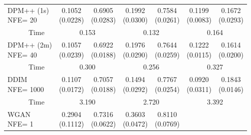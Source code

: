\documentclass[12pt]{article}
\theoremstyle{definition} %
\begin{document}
\begin{table}
\begin{tabular}{l*{3}{cc}}
 \cmidrule(lr){1-7}
 \makecell{DPM++ (1s)\\\scriptsize{NFE= 20}}
 & \makecell{0.1052\\\scriptsize(0.0228)} & \makecell{0.6905\\\scriptsize(0.0283)}
 & \makecell{0.1992\\\scriptsize(0.0300)} & \makecell{0.7584\\\scriptsize(0.0261)}
 & \makecell{0.1199\\\scriptsize(0.0083)} & \makecell{0.1672\\\scriptsize(0.0293)} \\
~~~~~~Time  & \multicolumn{2}{c}{0.153} & \multicolumn{2}{c}{0.132} & \multicolumn{2}{c}{0.164} \\
 \cmidrule(lr){1-7}
 \makecell{DPM++ (2m)\\\scriptsize{NFE= 40}}
 & \makecell{0.1057\\\scriptsize(0.0239)} & \makecell{0.6922\\\scriptsize(0.0188)}
 & \makecell{0.1976\\\scriptsize(0.0290)} & \makecell{0.7644\\\scriptsize(0.0259)}
 & \makecell{0.1222\\\scriptsize(0.0115)} & \makecell{0.1614\\\scriptsize(0.0200)} \\
~~~~~~Time  & \multicolumn{2}{c}{0.300} & \multicolumn{2}{c}{0.256} & \multicolumn{2}{c}{0.327} \\
 \cmidrule(lr){1-7}
 \makecell{DDIM\\\scriptsize{NFE= 1000}}
 & \makecell{0.1107\\\scriptsize(0.0172)} & \makecell{0.7057\\\scriptsize(0.0188)}
 & \makecell{0.1494\\\scriptsize(0.0292)} & \makecell{0.7767\\\scriptsize(0.0254)}
 & \makecell{0.0920\\\scriptsize(0.0311)} & \makecell{0.1843\\\scriptsize(0.0146)} \\
~~~~~~Time  & \multicolumn{2}{c}{3.190} & \multicolumn{2}{c}{2.720} & \multicolumn{2}{c}{3.392} \\
 \cmidrule(lr){1-7}
 \makecell{WGAN\\\scriptsize{NFE= 1}}
 & \makecell{0.2904\\\scriptsize(0.1112)} & \makecell{0.7316\\\scriptsize(0.0622)}
 & \makecell{0.3603\\\scriptsize(0.0472)} & \makecell{0.8110\\\scriptsize(0.0769)}

\end{tabular}
\end{table}
\end{document}
